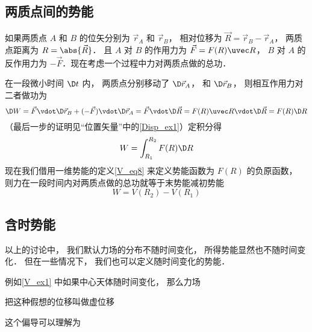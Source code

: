 \subsection{两质点间的势能}

如果两质点 $A$ 和 $B$ 的位矢分别为 $\vec r_A$ 和 $\vec r_B$， 相对位移为 $\vec R = \vec r_B - \vec r_A$， 两质点距离为 $R = \abs{\vec R}$． 且 $A$ 对 $B$ 的作用力为 $\vec F = F(R) \uvec R$， $B$ 对 $A$ 的反作用力为 $-\vec F$．现在考虑一个过程中力对两质点做的总功．

在一段微小时间 $\D t$ 内， 两质点分别移动了 $\D \vec r_A$， 和 $\D \vec r_B$， 则相互作用力对二者做功为
\begin{equation}
\D W = \vec F \vdot \D \vec r_B + (- \vec F) \vdot \D \vec r_A = \vec F \vdot \D \vec R
= F(R)\uvec R\vdot\D \vec R = F(R) \D R
\end{equation}
（最后一步的证明见“位置矢量”中的\autoref{Disp_ex1}）定积分得
\begin{equation}
W = \int_{R_1}^{R_2}  F(R) \D R
\end{equation}
现在我们借用一维势能的定义\autoref{V_eq8} 来定义势能函数为 $F(R)$ 的负原函数， 则力在一段时间内对两质点做的总功就等于末势能减初势能
\begin{equation}\label{V_eq20}
W = V(R_2) - V(R_1)
\end{equation}


\subsection{含时势能}
以上的讨论中， 我们默认力场的分布不随时间变化， 所得势能显然也不随时间变化． 但在一些情况下， 我们也可以定义随时间变化的势能．


 例如\autoref{V_ex1} 中如果中心天体随时间变化， 那么力场

把这种假想的位移叫做虚位移

这个偏导可以理解为




